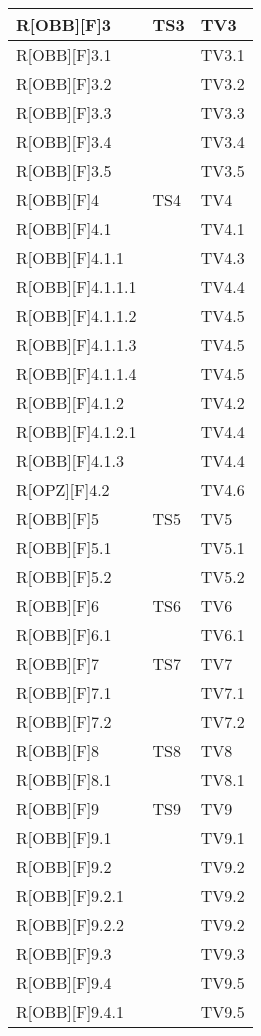 	\begin{table}[h]
			\begin{tabular}{|p{0.3\textwidth}|p{}|p{}|}
			\midrule
			
			R[OBB][F]3 & TS3  & TV3 \\ \midrule
			R[OBB][F]3.1 &  & TV3.1 \\ \midrule
			R[OBB][F]3.2 &  & TV3.2 \\ \midrule
			R[OBB][F]3.3 &  & TV3.3 \\ \midrule
			R[OBB][F]3.4 &  & TV3.4 \\ \midrule
			R[OBB][F]3.5 &  & TV3.5 \\ \midrule
			R[OBB][F]4 & TS4 & TV4 \\ \midrule
			R[OBB][F]4.1 &  & TV4.1 \\ \midrule
			R[OBB][F]4.1.1 &  & TV4.3 \\ \midrule
			R[OBB][F]4.1.1.1 &  & TV4.4 \\ \midrule
			R[OBB][F]4.1.1.2 &  & TV4.5 \\ \midrule
			R[OBB][F]4.1.1.3 &  & TV4.5 \\ \midrule
			R[OBB][F]4.1.1.4 &  & TV4.5 \\ \midrule
			R[OBB][F]4.1.2 &  & TV4.2 \\ \midrule
			R[OBB][F]4.1.2.1 &  & TV4.4 \\ \midrule
			R[OBB][F]4.1.3 &  & TV4.4 \\ \midrule
			R[OPZ][F]4.2 &  & TV4.6 \\ \midrule
			R[OBB][F]5 & TS5 & TV5 \\ \midrule
			R[OBB][F]5.1 &  & TV5.1 \\ \midrule
			R[OBB][F]5.2 &  & TV5.2 \\ \midrule
			R[OBB][F]6 & TS6 & TV6 \\ \midrule
			R[OBB][F]6.1 &  & TV6.1 \\ \midrule
			R[OBB][F]7 & TS7 & TV7 \\ \midrule
			R[OBB][F]7.1 &  & TV7.1 \\ \midrule
			R[OBB][F]7.2 &  & TV7.2 \\ \midrule
			R[OBB][F]8 & TS8 & TV8 \\ \midrule
			R[OBB][F]8.1 &  & TV8.1 \\ \midrule
			R[OBB][F]9 & TS9 & TV9 \\ \midrule
			R[OBB][F]9.1 &  & TV9.1 \\ \midrule
			R[OBB][F]9.2 &  & TV9.2 \\ \midrule
			R[OBB][F]9.2.1 &  & TV9.2 \\ \midrule
			R[OBB][F]9.2.2 &  & TV9.2 \\ \midrule
			R[OBB][F]9.3 &  & TV9.3 \\ \midrule
			R[OBB][F]9.4 &  & TV9.5 \\ \midrule
			R[OBB][F]9.4.1 &  & TV9.5 \\ \midrule

		\end{tabular}
	\end{table}
	\newpage
	
